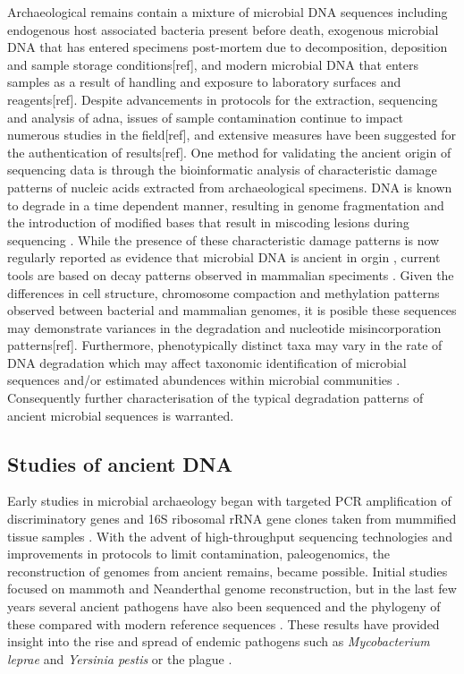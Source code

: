 \documentclass[12pt, a4paper]{article}
\begin{document}
Archaeological remains contain a mixture of microbial DNA sequences including endogenous host associated bacteria present before death, exogenous microbial DNA that has entered specimens post-mortem due to decomposition, deposition and sample storage conditions[ref], and modern microbial DNA that enters samples as a result of handling and exposure to laboratory surfaces and reagents[ref].
Despite advancements in protocols for the extraction, sequencing and analysis of \gls{adna}, issues of sample contamination continue to impact numerous studies in the field[ref], and extensive measures have been suggested for the authentication of results[ref].
One method for validating the ancient origin of sequencing data is through the bioinformatic analysis of characteristic damage patterns of nucleic acids extracted from archaeological specimens.  
DNA is known to degrade in a time dependent manner, resulting in genome fragmentation \cite{Allentoft:2012aa} and the introduction of modified bases that result in miscoding lesions during sequencing \cite{Briggs:2007aa,Brotherton:2007aa,Hofreiter:2001aa}. 
While the presence of these characteristic damage patterns is now regularly reported as evidence that microbial DNA is ancient in orgin \cite{Bos:2015aa,Weyrich:2017aa,Warinner:2014aa}, current tools are based on decay patterns observed in mammalian speciments \cite{Briggs:2007aa,Jonsson:2013aa}.
Given the differences in cell structure, chromosome compaction and methylation patterns observed between bacterial and mammalian genomes, it is posible these sequences may demonstrate variances in the degradation and nucleotide misincorporation patterns[ref].
Furthermore, phenotypically distinct taxa may vary in the rate of DNA degradation which may affect taxonomic identification of microbial sequences and/or estimated abundences within microbial communities \cite{Weyrich:2017aa}.
Consequently further characterisation of the typical degradation patterns of ancient microbial sequences is warranted.


\subsection{Studies of ancient DNA}

Early studies in microbial archaeology began with targeted PCR amplification of discriminatory genes \cite{Spigelman:1993,SALO:1994aa,Drancourt:1998aa} and 16S ribosomal rRNA gene clones taken from mummified tissue samples \cite{Cano:2000aa}.
With the advent of high-throughput sequencing technologies and improvements in protocols to limit contamination, paleogenomics, the reconstruction of genomes from ancient remains, became possible. 
Initial studies focused on mammoth \cite{Poinar:2006aa} and Neanderthal \cite{Green:2006aa} genome reconstruction, but in the last few years several ancient pathogens have also been sequenced and the phylogeny of these compared with modern reference sequences \cite{Schuenemann:2013aa,Kay:2014aa,Wagner:2014aa,Lugli:2017aa}.
These results have provided insight into the rise and spread of endemic pathogens such as \textit{Mycobacterium leprae} \cite{Schuenemann:2013aa} and \textit{Yersinia pestis} or the plague \cite{Wagner:2014aa}.
\end{document}
